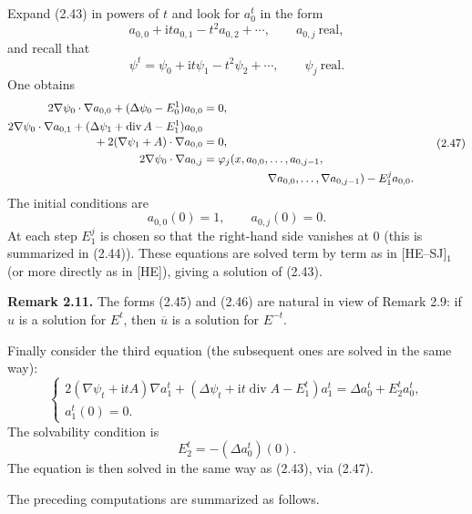 \documentclass[11pt]{article}
\newcommand{\ii}{\mathrm{i}}
\begin{document}
Expand (2.43) in powers of $t$ and look for $a_0^t$ in the form
\begin{equation}
a_{0,0}+\ii t a_{0,1}-t^2a_{0,2}+\cdots,
\qquad a_{0,j}\ \text{real},
\tag{2.45}
\end{equation}
and recall that
\begin{equation}
\psi^t=\psi_0+\ii t\psi_1-t^2\psi_2+\cdots,
\qquad \psi_j\ \text{real}.
\tag{2.46}
\end{equation}
One obtains
\begin{equation}
\begin{aligned}
2\nabla\psi_0\cdot\nabla a_{0,0}+(\Delta\psi_0-E_0^1)a_{0,0}&=0,\\
2\nabla\psi_0\cdot\nabla a_{0,1}
+(\Delta\psi_1+\operatorname{div}A-E_1^1)a_{0,0}&\\[-0.4ex]
\qquad{}+2(\nabla\psi_1+A)\cdot\nabla a_{0,0}&=0,\\
2\nabla\psi_0\cdot\nabla a_{0,j}
&=\varphi_j(x,a_{0,0},\ldots,a_{0,j-1},\\
&\hspace{2.0cm}\nabla a_{0,0},\ldots,\nabla a_{0,j-1})-E_1^j a_{0,0}.
\end{aligned}
\tag{2.47}
\end{equation}
The initial conditions are
\[
a_{0,0}(0)=1,\qquad a_{0,j}(0)=0.
\]
At each step $E_1^j$ is chosen so that the right-hand side vanishes at $0$ (this is summarized in (2.44)). These equations are solved term by term as in [HE--SJ]$_1$ (or more directly as in [HE]), giving a solution of (2.43).

\medskip
\noindent\textbf{Remark 2.11.}
The forms (2.45) and (2.46) are natural in view of Remark 2.9: if $u$ is a solution for $E^t$, then $\overline u$ is a solution for $E^{-t}$.

Finally consider the third equation (the subsequent ones are solved in the same way):
\begin{equation}
\begin{cases}
2(\nabla\psi_t+\ii tA)\nabla a_1^t
+(\Delta\psi_t+\ii t\operatorname{div}A-E_1^t)a_1^t
=\Delta a_0^t+E_2^t a_0^t,\\
a_1^t(0)=0.
\end{cases}
\tag{2.48}
\end{equation}
The solvability condition is
\begin{equation}
E_2^t=-(\Delta a_0^t)(0).
\tag{2.49}
\end{equation}
The equation is then solved in the same way as (2.43), via (2.47).

The preceding computations are summarized as follows.
\end{document}
